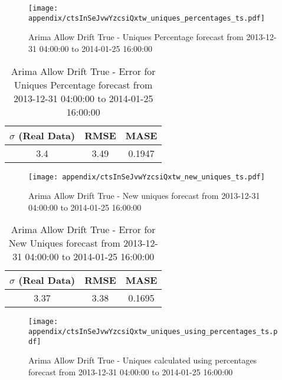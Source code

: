 \begin{figure}[H] \begin{center} \leavevmode
\texttt{[image: appendix/ctsInSeJvwYzcsiQxtw\_uniques\_percentages\_ts.pdf]} \caption{
Arima Allow Drift True - Uniques Percentage forecast from 2013-12-31 04:00:00 to 2014-01-25 16:00:00} \label{fig:appendix/ctsInSeJvwYzcsiQxtw_uniques_percentages_ts.pdf} \end{center}
\end{figure}

\begin{table}[H]
\centering
\footnotesize
\begin{tabular}{ccc}
$\sigma$ (Real Data) & RMSE & MASE   \\ \hline
3.4 & 3.49 & 0.1947 \\
\end{tabular}

\vspace{0.5cm}

\caption{
Arima Allow Drift True - Error for Uniques Percentage forecast from 2013-12-31 04:00:00 to 2014-01-25 16:00:00}
\end{table}

\begin{figure}[H] \begin{center} \leavevmode
\texttt{[image: appendix/ctsInSeJvwYzcsiQxtw\_new\_uniques\_ts.pdf]} \caption{
Arima Allow Drift True - New uniques forecast from 2013-12-31 04:00:00 to 2014-01-25 16:00:00} \label{fig:appendix/ctsInSeJvwYzcsiQxtw_new_uniques_ts.pdf} \end{center}
\end{figure}

\begin{table}[H]
\centering
\footnotesize
\begin{tabular}{ccc}
$\sigma$ (Real Data) & RMSE & MASE   \\ \hline
3.37 & 3.38 & 0.1695 \\
\end{tabular}

\vspace{0.5cm}

\caption{
Arima Allow Drift True - Error for New Uniques forecast from 2013-12-31 04:00:00 to 2014-01-25 16:00:00}
\end{table}

\begin{figure}[H] \begin{center} \leavevmode
\texttt{[image: appendix/ctsInSeJvwYzcsiQxtw\_uniques\_using\_percentages\_ts.pdf]} \caption{
Arima Allow Drift True - Uniques calculated using percentages forecast from 2013-12-31 04:00:00 to 2014-01-25 16:00:00} \label{fig:appendix/ctsInSeJvwYzcsiQxtw_uniques_using_percentages_ts.pdf} \end{center}
\end{figure}

